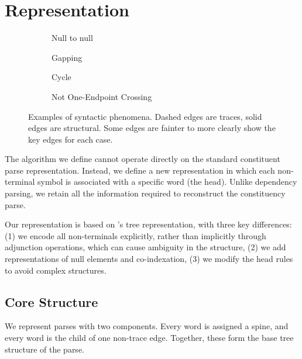 \section{Representation}

\begin{figure*}
\begin{subfigure}[b][3.75cm][b]{0.19\textwidth}
  \centering
  \scalebox{0.5}{}
  \caption{\label{fig:null-null}
    Null to null
  }
\end{subfigure}
\hspace{4mm}
\begin{subfigure}[b][3.75cm][b]{0.24\textwidth}
  \centering
  \scalebox{0.5}{ }
  \caption{\label{fig:gapping}
    Gapping
  }
\end{subfigure}
\hspace{4mm}
\begin{subfigure}[b][3.75cm][b]{0.16\textwidth}
  \centering
  \scalebox{0.5}{ }
  \caption{\label{fig:cycle}
    Cycle
  }
\end{subfigure}
\hspace{4mm}
\begin{subfigure}[b][3.75cm][b]{0.29\textwidth}
  \centering
  \scalebox{0.5}{ }
  \caption{\label{fig:not-1ec}
    Not One-Endpoint Crossing
  }
\end{subfigure}
\caption{
Examples of syntactic phenomena.
Dashed edges are traces, solid edges are structural.
Some edges are fainter to more clearly show the key edges for each case.
}
\end{figure*}

The algorithm we define cannot operate directly on the standard constituent parse representation.
Instead, we define a new representation in which each non-terminal symbol is associated with a specific word (the head).
Unlike dependency parsing, we retain all the information required to reconstruct the constituency parse.

Our representation is based on \textcite{cck}'s tree representation, with three key differences:
(1) we encode all non-terminals explicitly, rather than implicitly through adjunction operations, which can cause ambiguity in the structure,
(2) we add representations of null elements and co-indexation,
(3) we modify the head rules to avoid complex structures.

\subsection{Core Structure}
We represent parses with two components.
Every word is assigned a spine, and every word is the child of one non-trace edge.
Together, these form the base tree structure of the parse.

